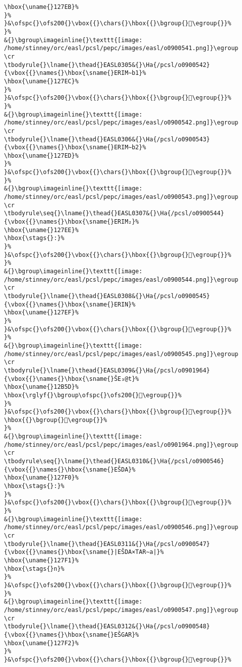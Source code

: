 \begin{verbatim}
\hbox{\uname{}127EB}%
}%
}&\ofspc{}\ofs200{}\vbox{{}\chars{}\hbox{{}\bgroup{}𒟫\egroup{}}%
}%
&{}\bgroup\imageinline{}\texttt{[image: /home/stinney/orc/easl/pcsl/pepc/images/easl/o0900541.png]}\egroup
\cr
\tbodyrule{}\lname{}\thead{}EASL0305&{}\Ha{/pcsl/o0900542}{\vbox{{}\names{}\hbox{\sname{}ERIM∼b1}%
\hbox{\uname{}127EC}%
}%
}&\ofspc{}\ofs200{}\vbox{{}\chars{}\hbox{{}\bgroup{}𒟬\egroup{}}%
}%
&{}\bgroup\imageinline{}\texttt{[image: /home/stinney/orc/easl/pcsl/pepc/images/easl/o0900542.png]}\egroup
\cr
\tbodyrule{}\lname{}\thead{}EASL0306&{}\Ha{/pcsl/o0900543}{\vbox{{}\names{}\hbox{\sname{}ERIM∼b2}%
\hbox{\uname{}127ED}%
}%
}&\ofspc{}\ofs200{}\vbox{{}\chars{}\hbox{{}\bgroup{}𒟭\egroup{}}%
}%
&{}\bgroup\imageinline{}\texttt{[image: /home/stinney/orc/easl/pcsl/pepc/images/easl/o0900543.png]}\egroup
\cr
\tbodyrule\seq{}\lname{}\thead{}EASL0307&{}\Ha{/pcsl/o0900544}{\vbox{{}\names{}\hbox{\sname{}ERIM₂}%
\hbox{\uname{}127EE}%
\hbox{\stags{}:}%
}%
}&\ofspc{}\ofs200{}\vbox{{}\chars{}\hbox{{}\bgroup{}𒟮\egroup{}}%
}%
&{}\bgroup\imageinline{}\texttt{[image: /home/stinney/orc/easl/pcsl/pepc/images/easl/o0900544.png]}\egroup
\cr
\tbodyrule{}\lname{}\thead{}EASL0308&{}\Ha{/pcsl/o0900545}{\vbox{{}\names{}\hbox{\sname{}ERIN}%
\hbox{\uname{}127EF}%
}%
}&\ofspc{}\ofs200{}\vbox{{}\chars{}\hbox{{}\bgroup{}𒟯\egroup{}}%
}%
&{}\bgroup\imageinline{}\texttt{[image: /home/stinney/orc/easl/pcsl/pepc/images/easl/o0900545.png]}\egroup
\cr
\tbodyrule{}\lname{}\thead{}EASL0309&{}\Ha{/pcsl/o0901964}{\vbox{{}\names{}\hbox{\sname{}ŠE₃@t}%
\hbox{\uname{}12B5D}%
\hbox{\rglyf{}\bgroup\ofspc{}\ofs200{}𒭝\egroup{}}%
}%
}&\ofspc{}\ofs200{}\vbox{{}\chars{}\hbox{{}\bgroup{}𒭛\egroup{}}%
\hbox{{}\bgroup{}𒭝\egroup{}}%
}%
&{}\bgroup\imageinline{}\texttt{[image: /home/stinney/orc/easl/pcsl/pepc/images/easl/o0901964.png]}\egroup
\cr
\tbodyrule\seq{}\lname{}\thead{}EASL0310&{}\Ha{/pcsl/o0900546}{\vbox{{}\names{}\hbox{\sname{}EŠDA}%
\hbox{\uname{}127F0}%
\hbox{\stags{}:}%
}%
}&\ofspc{}\ofs200{}\vbox{{}\chars{}\hbox{{}\bgroup{}𒟰\egroup{}}%
}%
&{}\bgroup\imageinline{}\texttt{[image: /home/stinney/orc/easl/pcsl/pepc/images/easl/o0900546.png]}\egroup
\cr
\tbodyrule{}\lname{}\thead{}EASL0311&{}\Ha{/pcsl/o0900547}{\vbox{{}\names{}\hbox{\sname{}|EŠDA×TAR∼a|}%
\hbox{\uname{}127F1}%
\hbox{\stags{}n}%
}%
}&\ofspc{}\ofs200{}\vbox{{}\chars{}\hbox{{}\bgroup{}𒟱\egroup{}}%
}%
&{}\bgroup\imageinline{}\texttt{[image: /home/stinney/orc/easl/pcsl/pepc/images/easl/o0900547.png]}\egroup
\cr
\tbodyrule{}\lname{}\thead{}EASL0312&{}\Ha{/pcsl/o0900548}{\vbox{{}\names{}\hbox{\sname{}EŠGAR}%
\hbox{\uname{}127F2}%
}%
}&\ofspc{}\ofs200{}\vbox{{}\chars{}\hbox{{}\bgroup{}𒟲\egroup{}}%

\end{verbatim}
